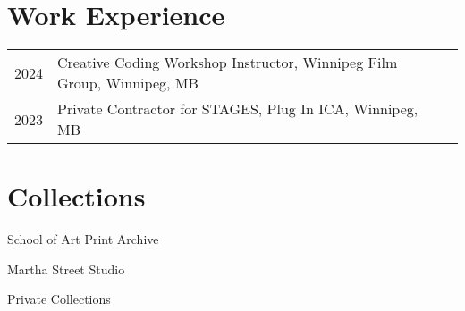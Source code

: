\documentclass[12pt]{article}
\begin{document}
\begin{flushleft}
\section{Work Experience}
\begin{tabular}{@{}lll}
2024 & Creative Coding Workshop Instructor, Winnipeg Film Group, Winnipeg, MB \\
2023 & Private Contractor for STAGES, Plug In ICA, Winnipeg, MB
\end{tabular}
\section{Collections}
School of Art Print Archive

Martha Street Studio

Private Collections
\end{flushleft}
\end{document}
